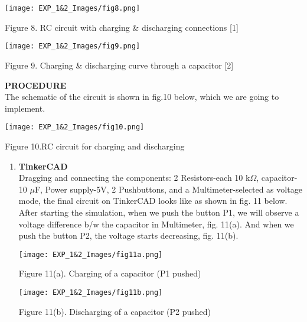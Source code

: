 \documentclass[12pt,a4paper]{article}
\begin{document}
\begin{justify}
    \begin{center} 
    \texttt{[image: EXP\_1\&2\_Images/fig8.png]}
    \end{center}
    \vspace{-5mm}
    \begin{center} {Figure 8. RC circuit with charging \& discharging connections [1]}\end{center}

    \begin{center} 
    \texttt{[image: EXP\_1\&2\_Images/fig9.png]}
    \end{center}
    \vspace{-5mm}
    \begin{center} {Figure 9. Charging \& discharging curve through a capacitor [2]}\end{center}

\noindent \textbf{\large PROCEDURE}\\[3pt]
The schematic of the circuit is shown in fig.10 below, which we are going to implement. 
    \begin{center} 
    \texttt{[image: EXP\_1\&2\_Images/fig10.png]}
    \end{center}
    \vspace{-5mm}
    \begin{center} {Figure 10.RC circuit for charging and discharging}\end{center}

\begin{enumerate}

\item \textbf{TinkerCAD}\\
Dragging and connecting the components: 2 Resistors-each 10 k$\Omega$, capacitor-10 $\mu$F, Power supply-5V, 2 Pushbuttons, and a Multimeter-selected as voltage mode, the final circuit on TinkerCAD looks like as shown in fig. 11 below. After starting the simulation, when we push the button P1, we will observe a voltage difference b/w the capacitor in Multimeter, fig. 11(a). And when we push the button P2, the voltage starts decreasing, fig. 11(b).

    \begin{center} 
    \texttt{[image: EXP\_1\&2\_Images/fig11a.png]}
    \end{center}
    \vspace{-5mm}
    \begin{center} {Figure 11(a). Charging of a capacitor (P1 pushed)}\end{center}
    \begin{center} 
    \texttt{[image: EXP\_1\&2\_Images/fig11b.png]}
    \end{center}
    \vspace{-5mm}
    \begin{center} {Figure 11(b). Discharging of a capacitor (P2 pushed)}\end{center}


\end{enumerate}
\end{justify}
\end{document}
